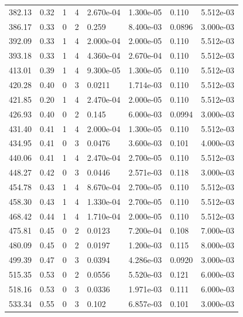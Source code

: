 \documentclass[preview]{standalone}
\begin{document}
{{{\begin{tabular}{L{1.2cm}C{1.2cm} C{0.3cm}C{0.5cm} C{1.4cm}C{1.4cm} C{1.4cm}C{1.4cm}}
  382.13  &  0.32  & 1     &  4 &  2.670e-04  & 1.300e-05  & 0.110 &  5.512e-03   \\ 
  386.17  &  0.33  & 0     &  2 &  0.259  & 8.400e-03  & 0.0896 &  3.000e-03   \\ 
  392.09  &  0.33  & 1     &  4 &  2.000e-04  & 2.000e-05  & 0.110 &  5.512e-03   \\ 
  393.18  &  0.33  & 1     &  4 &  4.360e-04  & 2.670e-04  & 0.110 &  5.512e-03   \\ 
  413.01  &  0.39  & 1     &  4 &  9.300e-05  & 1.300e-05  & 0.110 &  5.512e-03   \\ 
  420.28  &  0.40  & 0     &  3 &  0.0211  & 1.714e-03  & 0.110 &  5.512e-03   \\ 
  421.85  &  0.20  & 1     &  4 &  2.470e-04  & 2.000e-05  & 0.110 &  5.512e-03   \\ 
  426.93  &  0.40  & 0     &  2 &  0.145  & 6.000e-03  & 0.0994 &  3.000e-03   \\ 
  431.40  &  0.41  & 1     &  4 &  2.000e-04  & 1.300e-05  & 0.110 &  5.512e-03   \\ 
  434.95  &  0.41  & 0     &  3 &  0.0476  & 3.600e-03  & 0.101 &  4.000e-03   \\ 
  440.06  &  0.41  & 1     &  4 &  2.470e-04  & 2.700e-05  & 0.110 &  5.512e-03   \\ 
  448.27  &  0.42  & 0     &  3 &  0.0446  & 2.571e-03  & 0.118 &  3.000e-03   \\ 
  454.78  &  0.43  & 1     &  4 &  8.670e-04  & 2.700e-05  & 0.110 &  5.512e-03   \\ 
  458.30  &  0.43  & 1     &  4 &  1.330e-04  & 2.700e-05  & 0.110 &  5.512e-03   \\ 
  468.42  &  0.44  & 1     &  4 &  1.710e-04  & 2.000e-05  & 0.110 &  5.512e-03   \\ 
  475.81  &  0.45  & 0     &  2 &  0.0123  & 7.200e-04  & 0.108 &  7.000e-03   \\ 
  480.09  &  0.45  & 0     &  2 &  0.0197  & 1.200e-03  & 0.115 &  8.000e-03   \\ 
  499.39  &  0.47  & 0     &  3 &  0.0394  & 4.286e-03  & 0.0920 &  3.000e-03   \\ 
  515.35  &  0.53  & 0     &  2 &  0.0556  & 5.520e-03  & 0.121 &  6.000e-03   \\ 
  518.16  &  0.53  & 0     &  3 &  0.0336  & 1.971e-03  & 0.111 &  6.000e-03   \\ 
  533.34  &  0.55  & 0     &  3 &  0.102  & 6.857e-03  & 0.101 &  3.000e-03   \\ 

\end{tabular}}}}
\end{document}
